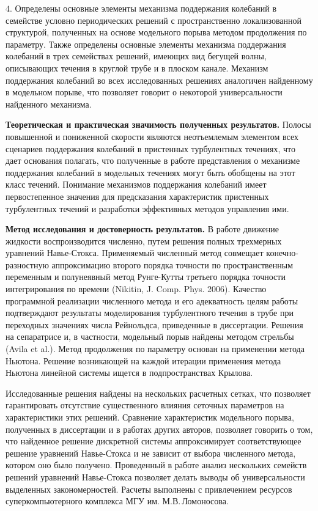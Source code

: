 \noindent $4.$ Определены основные элементы механизма поддержания колебаний в семействе условно периодических решений с пространственно локализованной структурой, полученных на основе модельного порыва методом продолжения по параметру. Также определены основные элементы механизма поддержания колебаний в трех семействах решений, имеющих вид бегущей волны, описывающих течения в круглой трубе и в плоском канале. Механизм поддержания колебаний во всех исследованных решениях аналогичен найденному в модельном порыве, что позволяет говорит о некоторой универсальности найденного механизма. 

{\bf Теоретическая и практическая значимость полученных результатов.}
Полосы повышенной и пониженной скорости являются неотъемлемым элементом всех сценариев поддержания колебаний в пристенных турбулентных течениях, что дает основания полагать, что полученные в работе представления о механизме поддержания колебаний в модельных течениях могут быть обобщены на этот класс течений. Понимание механизмов поддержания колебаний имеет первостепенное значения для предсказания характеристик пристенных турбулентных течений и разработки эффективных методов управления ими.

\textbf{Метод исследования и достоверность результатов.}
В работе движение жидкости воспроизводится численно, путем решения полных трехмерных уравнений Навье-Стокса. Применяемый численный метод совмещает конечно-разностную аппроксимацию второго порядка точности по пространственным переменным и полунеявный метод Рунге-Кутты третьего порядка точности интегрирования по времени (Nikitin, J. Comp. Phys. 2006). Качество программной реализации численного метода и его адекватность целям работы подтверждают результаты моделирования турбулентного течения в трубе при переходных значениях числа Рейнольдса, приведенные в диссертации. Решения на сепаратрисе и, в частности, модельный порыв найдены методом стрельбы (Avila et al.). Метод продолжения по параметру основан на применении метода Ньютона. Решение возникающей на каждой итерации применения метода Ньютона линейной системы ищется в подпространствах Крылова.

Исследованные решения найдены на нескольких расчетных сетках, что позволяет гарантировать отсутствие существенного влияния сеточных параметров на характеристики этих решений. Сравнение характеристик модельного порыва, полученных в диссертации и в работах других авторов, позволяет говорить о том, что найденное решение дискретной системы аппроксимирует соответствующее решение уравнений Навье-Стокса и не зависит от выбора численного метода, котором оно было получено. Проведенный в работе анализ нескольких семейств решений уравнений Навье-Стокса позволяет делать выводы об универсальности выделенных закономерностей. Расчеты выполнены с привлечением ресурсов суперкомпьютерного комплекса МГУ им. М.В.\,Ломоносова.


